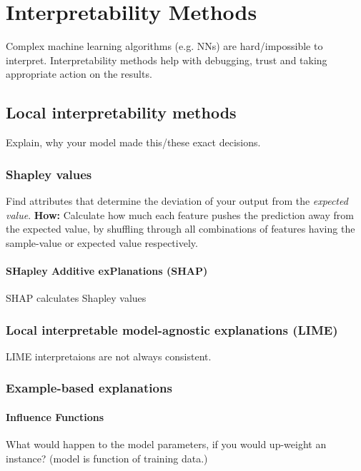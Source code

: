 \documentclass[../main.tex]{subfiles}
\begin{document}
\section{Interpretability Methods}
Complex machine learning algorithms (e.g. NNs) are hard/impossible to interpret. Interpretability methods help with debugging, trust and taking appropriate action on the results.

\subsection{Local interpretability methods}
Explain, why your model made this/these exact decisions. 

\subsubsection{Shapley values}
Find attributes that determine the deviation of your output from the \textit{expected value}. \textbf{How:} Calculate how much each feature pushes the prediction away from the expected value, by shuffling through all combinations of features having the sample-value or expected value respectively. \\
\paragraph{SHapley Additive exPlanations (SHAP)}
SHAP calculates Shapley values %

\subsubsection{Local interpretable model-agnostic explanations (LIME)}
\attention LIME interpretaions are not always consistent. %

\subsubsection{Example-based explanations}
\paragraph{Influence Functions}
What would happen to the model parameters, if you would up-weight an instance? (model is function of training data.)
\end{document}
